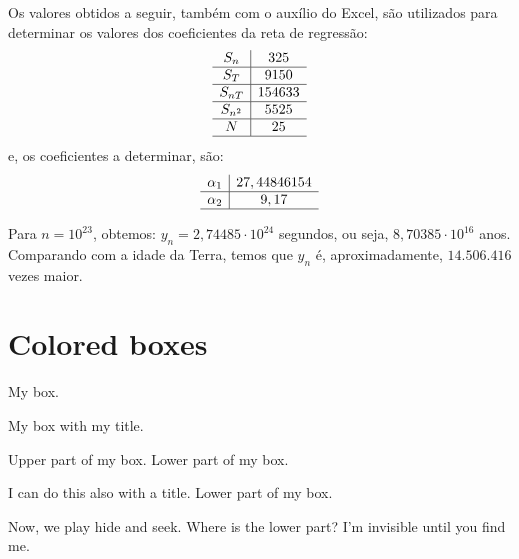 Os valores obtidos a seguir, também com o auxílio do Excel, são utilizados para determinar os valores dos coeficientes da reta de regressão:
\[
\begin{array}{c|c}
S_{n} & 325 \\ \hline
S_T & 9150 \\ \hline
S_{nT} & 154633 \\ \hline
S_{n^2} & 5525 \\ \hline
N & 25 \\ \hline
\end{array}
\]
e, os coeficientes a determinar, são:
\[
\begin{array}{c|c}
\alpha_{1} & 27,44846154 \\ \hline
\alpha_{2} & 9,17 \\ \hline
\end{array}
\]

Para \(n = 10^{23}\), obtemos: \(y_{n} = 2,74485 \cdot 10^{24}\) segundos, ou seja, \(8,70385 \cdot 10^{16}\) anos. Comparando com a idade da Terra, temos que \(y_{n}\) é, aproximadamente, \(14.506.416\) vezes maior.










\section{Colored boxes}

\begin{tcolorbox}[colback=red!5!white,colframe=red!75!black]
  My box.
\end{tcolorbox}

\begin{tcolorbox}[colback=blue!5!white,colframe=blue!75!black,title=My title]
  My box with my title.
\end{tcolorbox}

\begin{tcolorbox}[colback=green!5!white,colframe=green!75!black]
  Upper part of my box.
  \tcblower
  Lower part of my box.
\end{tcolorbox}

\begin{tcolorbox}[colback=yellow!5!white,colframe=yellow!50!black,
  colbacktitle=yellow!75!black,title=My title]
  I can do this also with a title.
  \tcblower
  Lower part of my box.
\end{tcolorbox}

\begin{tcolorbox}[colback=yellow!10!white,colframe=red!75!black,lowerbox=invisible,
  savelowerto=\jobname_ex.tex]
  Now, we play hide and seek. Where is the lower part?
  \tcblower
  I'm invisible until you find me.
\end{tcolorbox}

